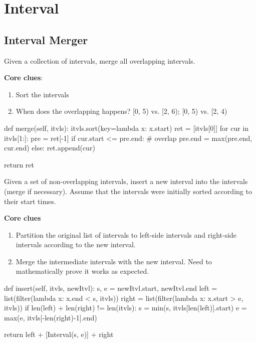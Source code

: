 \chapter{Interval}


\section{Interval Merger}
 Given a collection of intervals, merge all overlapping intervals.

\textbf{Core clues}:
\begin{enumerate}
\item Sort the intervals
\item When does the overlapping happens?
[0, 5) vs. [2, 6); [0, 5) vs. [2, 4)
\end{enumerate}
\begin{python}
def merge(self, itvls):
    itvls.sort(key=lambda x: x.start)
    ret = [itvls[0]]
    for cur in itvls[1:]:
        pre = ret[-1]
        if cur.start <= pre.end:  # overlap
            pre.end = max(pre.end, cur.end)
        else:
            ret.append(cur)

    return ret
\end{python}

 Given a set of non-overlapping intervals, insert a new interval into the intervals (merge if necessary). Assume that the intervals were initially sorted according to their start times.

\textbf{Core clues}
\begin{enumerate}
\item Partition the original list of intervals to left-side intervals and right-side intervals according to the new interval. 
\item Merge the intermediate intervals with the new interval. Need to mathematically prove it works as expected.
\end{enumerate}

\begin{python}
def insert(self, itvls, newItvl):
    s, e = newItvl.start, newItvl.end
    left = list(filter(lambda x: x.end < s, itvls))
    right = list(filter(lambda x: x.start > e, itvls))
    if len(left) + len(right) != len(itvls):
        s = min(s, itvls[len(left)].start)
        e = max(e, itvls[-len(right)-1].end)

    return left + [Interval(s, e)] + right
\end{python}
